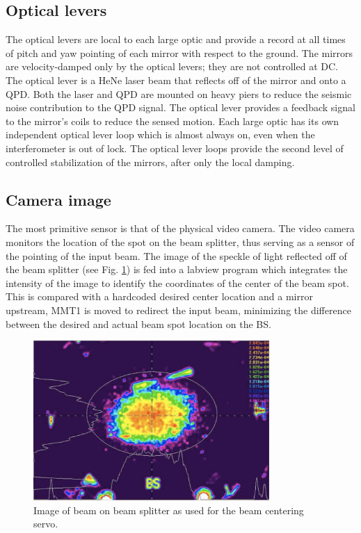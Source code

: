 \subsection{Optical levers}
The optical levers are local to each large optic and provide a record
at all times of pitch and yaw pointing of each mirror with respect to
the ground. The mirrors are velocity-damped only by the optical
levers; they are not controlled at DC. The optical lever is a HeNe
laser beam that reflects off of the mirror and onto a QPD. Both the
laser and QPD are mounted on heavy piers to reduce the seismic noise
contribution to the QPD signal. The optical lever provides a feedback
signal to the mirror's coils to reduce the sensed motion. Each large
optic has its own independent optical lever loop which is almost
always on, even when the interferometer is out of lock. The optical
lever loops provide the second level of controlled stabilization of
the mirrors, after only the local damping.


\subsection{Camera image}
The most primitive sensor is that of the physical video camera.  The
video camera monitors the location of the spot on the beam splitter,
thus serving as a sensor of the pointing of the input beam. The image
of the speckle of light reflected off of the beam splitter (see
Fig. \ref{fig:BCS}) is fed into a labview program which integrates the
intensity of the image to identify the coordinates of the center of
the beam spot. This is compared with a hardcoded desired center
location and a mirror upstream, MMT1 is moved to redirect the input
beam, minimizing the difference between the desired and actual beam
spot location on the BS.

\begin{figure}
\begin{centering}
\includegraphics[width=0.8\textwidth]{figures/BCSspiricon.pdf}
\caption{Image of beam on beam splitter as used for the beam centering servo.}
\label{fig:BCS}
\end{centering}
\end{figure}


